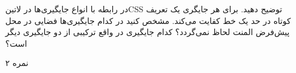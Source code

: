 \documentclass[../main.tex]{subfiles}
\begin{document}

در رابطه با انواع جایگیری‌ها در ‌لاتین{CSS} توضیح دهید. برای هر جایگری یک تعریف کوتاه در حد یک خط کفایت می‌کند. مشخص کنید در کدام
جایگیری‌ها فضایی در محل پیش‌فرض المنت لحاظ نمی‌گردد؟ کدام جایگیری در واقع ترکیبی از دو جایگیری دیگر است؟

۲ نمره
\end{document}
